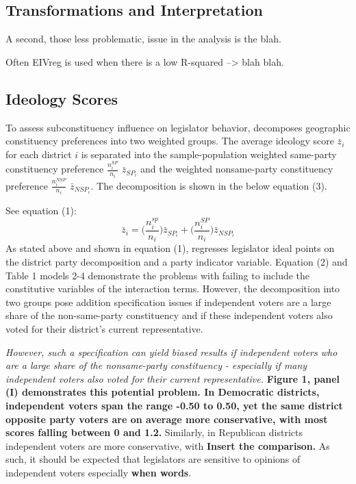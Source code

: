 \documentclass[10pt,letterpaper]{article}
\begin{document}
\newpage

\subsection{Transformations and Interpretation}
A second, those less problematic, issue in the \cite{Clinton2006} analysis is the blah.

Often EIVreg is used when there is a low R-squared --> blah blah.

\newpage


\subsection{Ideology Scores}
To assess subconstituency influence on legislator behavior, \cite{Clinton2006} decomposes geographic constituency preferences into two weighted groups. The average ideology score $\bar{z}_i$ for each district $i$ is separated into the sample-population weighted same-party constituency preference $\frac{n_i^{SP}}{n_i}$ $\bar{z}_{SP_i}$ and the weighted nonsame-party constituency preference $\frac{n_i^{NSP}}{n_i}$ $\bar{z}_{NSP_i}$. The decomposition is shown in the below equation (3).

See equation (1):
\begin{equation}
\bar{z}_i = \bigg( \frac{n_i^{sp}}{n_i} \bigg) \bar{z}_{SP_i} + \bigg( \frac{n_i^{SP}}{n_i} \bigg) \bar{z}_{NSP_i}
\end{equation}
As stated above and shown in equation (1), \cite{Clinton2006} regresses legislator ideal points on the district party decomposition and a party indicator variable. Equation (2) and Table 1 models 2-4 demonstrate the problems with failing to include the constitutive variables of the interaction terms. However, the decomposition into two groups pose addition specification issues if independent voters are a large share of the non-same-party constituency and if these independent voters also voted for their district's current representative. 

\textit{However, such a specification can yield biased results if independent voters who are a large share of the nonsame-party constituency - especially if many independent voters also voted for their current representative.} \textbf{Figure 1, panel (I) demonstrates this potential problem. In Democratic districts, independent voters span the range -0.50 to 0.50, yet the same district opposite party voters are on average more conservative, with most scores falling between 0 and 1.2.} Similarly, in Republican districts independent voters are more conservative, with \textbf{Insert the comparison.} As such, it should be expected that legislators are sensitive to opinions of independent voters especially \textbf{when words}.
\end{document}

